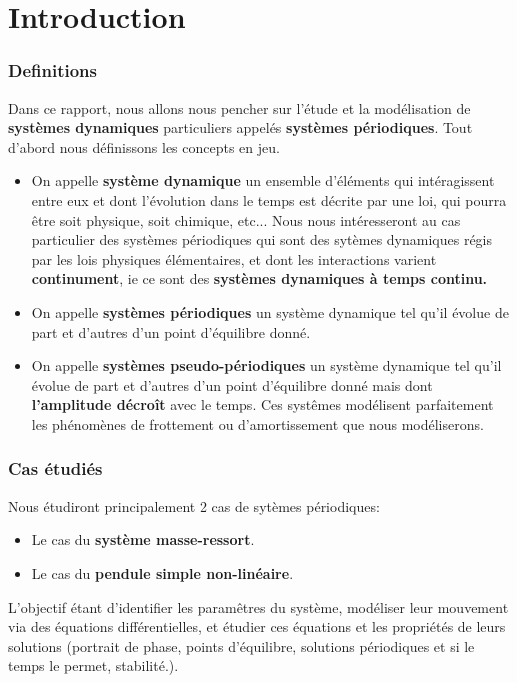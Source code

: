 \chapter{Introduction}
   \subsection{Definitions}
      Dans ce rapport, nous allons nous pencher sur l'étude et la modélisation de \textbf{systèmes dynamiques} particuliers appelés \textbf{systèmes périodiques}. Tout d'abord nous définissons les concepts en jeu.

      \begin{itemize}
         \item On appelle \textbf{système dynamique} un ensemble d'éléments qui intéragissent entre eux et dont l'évolution dans le temps est décrite par une loi, qui pourra être soit physique, soit chimique, etc... Nous nous intéresseront au cas particulier des systèmes périodiques qui sont des sytèmes dynamiques régis par les lois physiques élémentaires, et dont les interactions varient \textbf{continument}, ie ce sont des \textbf{systèmes dynamiques à temps continu.}
         \item On appelle \textbf{systèmes périodiques} un système dynamique tel qu'il évolue de part et d'autres d'un point d'équilibre donné.
         \item On appelle \textbf{systèmes pseudo-périodiques} un système dynamique tel qu'il évolue de part et d'autres d'un point d'équilibre donné mais dont \textbf{l'amplitude décroît} avec le temps. Ces systêmes modélisent parfaitement les phénomènes de frottement ou d'amortissement que nous modéliserons.
      \end{itemize}

   \subsection{Cas étudiés}
      Nous étudiront principalement 2 cas de sytèmes périodiques:
      \begin{itemize}
         \item Le cas du \textbf{système masse-ressort}.
         \item Le cas du \textbf{pendule simple non-linéaire}.
      \end{itemize}
      L'objectif étant d'identifier les paramêtres du système, modéliser leur mouvement via des équations différentielles, et étudier ces équations et les propriétés de leurs solutions (portrait de phase, points d'équilibre, solutions périodiques et si le temps le permet, stabilité.).

